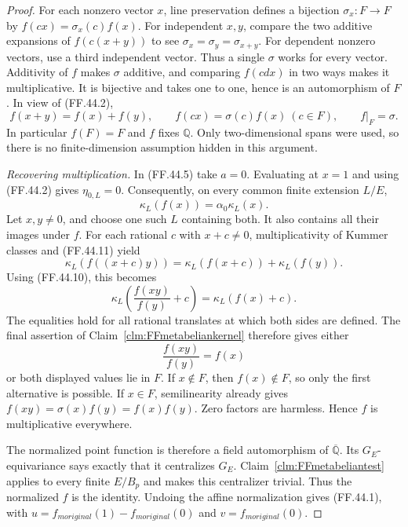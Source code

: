 \begin{proof}
For each nonzero vector \(x\),
line preservation defines a bijection
\(\sigma_x:F\to F\) by
\(f(cx)=\sigma_x(c)f(x)\).
For independent \(x,y\), compare
the two additive expansions of
\(f(c(x+y))\) to see
\(\sigma_x=\sigma_y=\sigma_{x+y}\).
For dependent nonzero vectors,
use a third independent vector.
Thus a single \(\sigma\) works
for every vector. Additivity of
\(f\) makes \(\sigma\) additive,
and comparing \(f(cd x)\) in
two ways makes it multiplicative.
It is bijective and takes one
to one, hence is an automorphism
of \(F\). In view of (FF.44.2),
\[
      f(x+y)=f(x)+f(y),\qquad
      f(cx)=\sigma(c)f(x)\ (c\in F),\qquad
      f|_F=\sigma.
                                                        \tag{FF.44.10}
\]
In particular \(f(F)=F\) and
\(f\) fixes \(\mathbb Q\).
Only two-dimensional spans were
used, so there is no finite-dimension
assumption hidden in this argument.

\emph{Recovering multiplication.}
In (FF.44.5) take \(a=0\).
Evaluating at \(x=1\) and using
(FF.44.2) gives \(\eta_{0,L}=0\).
Consequently, on every common finite
extension \(L/E\),
\[
                            \kappa_L(f(x))
                                   =\alpha_0\kappa_L(x).
                                                        \tag{FF.44.11}
\]
Let \(x,y\ne0\), and choose
one such \(L\) containing both.
It also contains all their images
under \(f\). For each rational
\(c\) with \(x+c\ne0\),
multiplicativity of Kummer classes
and (FF.44.11) yield
\[
       \kappa_L(f((x+c)y))
                     =\kappa_L(f(x+c))+\kappa_L(f(y)).
\]
Using (FF.44.10), this becomes
\[
       \kappa_L\!\left(\frac{f(xy)}{f(y)}+c\right)
                     =\kappa_L(f(x)+c).
                                                        \tag{FF.44.12}
\]
The equalities hold for all rational
translates at which both sides
are defined. The final assertion
of Claim~\ref{clm:FFmetabeliankernel}
therefore gives either
\[
                        \frac{f(xy)}{f(y)}=f(x)
\]
or both displayed values lie in
\(F\). If \(x\notin F\),
then \(f(x)\notin F\), so
only the first alternative is
possible. If \(x\in F\),
semilinearity already gives
\(f(xy)=\sigma(x)f(y)=f(x)f(y)\).
Zero factors are harmless. Hence
\(f\) is multiplicative everywhere.

The normalized point function is
therefore a field automorphism of
\(\overline{\mathbb Q}\).
Its \(G_E\)-equivariance says exactly
that it centralizes \(G_E\).
Claim~\ref{clm:FFmetabeliantest}
applies to every finite \(E/B_p\)
and makes this centralizer trivial.
Thus the normalized \(f\) is
the identity. Undoing the affine
normalization gives (FF.44.1), with
\(u=f_{
m original}(1)-f_{
m original}(0)\)
and \(v=f_{
m original}(0)\).
\end{proof}

